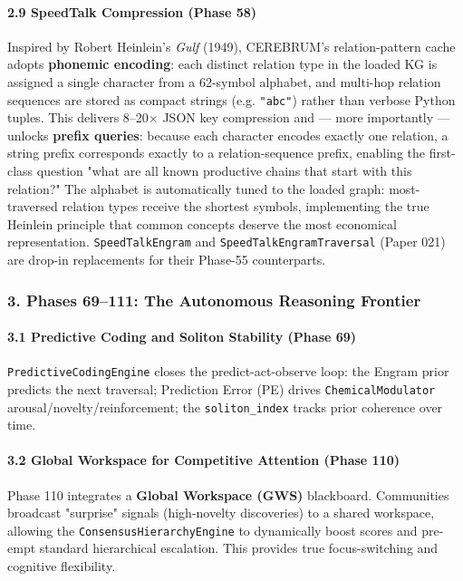 \paragraph{2.9 SpeedTalk Compression (Phase 58)}
Inspired by Robert Heinlein's \textit{Gulf} (1949), CEREBRUM's relation-pattern cache adopts \textbf{phonemic encoding}: each distinct relation type in the loaded KG is assigned a single character from a 62-symbol alphabet, and multi-hop relation sequences are stored as compact strings (e.g. \texttt{"abc"}) rather than verbose Python tuples. This delivers 8–20$\times$ JSON key compression and — more importantly — unlocks \textbf{prefix queries}: because each character encodes exactly one relation, a string prefix corresponds exactly to a relation-sequence prefix, enabling the first-class question "what are all known productive chains that start with this relation?" The alphabet is autom\-atically tuned to the loaded graph: most-traversed relation types receive the shortest symbols, imple\-menting the true Heinlein principle that common concepts deserve the most economical repre\-sentation. \texttt{SpeedTalkEngram} and \texttt{SpeedTalkEngramTraversal} (Paper 021) are drop-in repla\-cements for their Phase-55 count\-erparts.

\subsubsection{3. Phases 69–111: The Autonomous Reasoning Frontier}

\paragraph{3.1 Predictive Coding and Soliton Stability (Phase 69)}
\texttt{PredictiveCodingEngine} closes the predict-act-observe loop: the Engram prior predicts the next traversal; Prediction Error (PE) drives \texttt{ChemicalModulator} arousal/novelty/reinf\-orcement; the \texttt{soliton\_index} tracks prior coherence over time.

\paragraph{3.2 Global Workspace for Competitive Attention (Phase 110)}
Phase 110 integrates a \textbf{Global Workspace (GWS)} blackboard. Communities broadcast "surprise" signals (high-novelty discoveries) to a shared workspace, allowing the \texttt{ConsensusHierarchyEngine} to dynamically boost scores and pre-empt standard hiera\-rchical escalation. This provides true focus-switching and cognitive flexibility.

